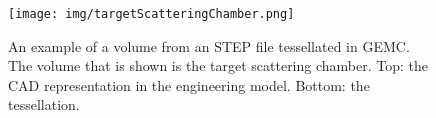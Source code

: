 \begin{figure}
	\centering
	\texttt{[image: img/targetScatteringChamber.png]}
	\caption{An example of a volume from an STEP file tessellated in GEMC. The volume that is shown is the target scattering chamber.
            Top: the CAD representation in the engineering model. Bottom: the tessellation. }
	\label{fig:targetScatteringChamber}
\end{figure}




